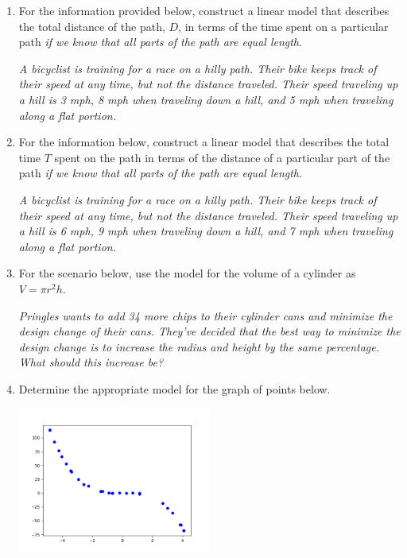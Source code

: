 \documentclass[14pt]{extbook}
\begin{document}
\begin{enumerate}
\item{
For the information provided below, construct a linear model that describes the total distance of the path, $D$, in terms of the time spent on a particular path \textit{if we know that all parts of the path are equal length}.
\begin{center}
    \textit{ A bicyclist is training for a race on a hilly path. Their bike keeps track of their speed at any time, but not the distance traveled. Their speed traveling up a hill is 3 mph, 8 mph when traveling down a hill, and 5 mph when traveling along a flat portion. }
\end{center}
} \newpage
\item{
For the information below, construct a linear model that describes the total time $T$ spent on the path in terms of the distance of a particular part of the path \textit{if we know that all parts of the path are equal length}.
\begin{center}
    \textit{ A bicyclist is training for a race on a hilly path. Their bike keeps track of their speed at any time, but not the distance traveled. Their speed traveling up a hill is 6 mph, 9 mph when traveling down a hill, and 7 mph when traveling along a flat portion. }
\end{center}
} \newpage
\item{
For the scenario below, use the model for the volume of a cylinder as $V = \pi r^2 h$.
\begin{center}
    \textit{ Pringles wants to add 34  more chips to their cylinder cans and minimize the design change of their cans. They've decided that the best way to minimize the design change is to increase the radius and height by the same percentage. What should this increase be? }
\end{center}
} \newpage
\item{
Determine the appropriate model for the graph of points below.
\begin{center}
    \includegraphics[width=0.5\textwidth]{../Figures/identifyModelGraph12CopyA.png}

\end{center}}
\end{enumerate}
\end{document}
